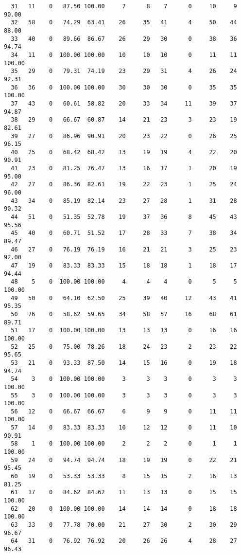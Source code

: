 \begin{verbatim}
  31   11    0   87.50 100.00     7      8    7      0     10     9    90.00
  32   58    0   74.29  63.41    26     35   41      4     50    44    88.00
  33   40    0   89.66  86.67    26     29   30      0     38    36    94.74
  34   11    0  100.00 100.00    10     10   10      0     11    11   100.00
  35   29    0   79.31  74.19    23     29   31      4     26    24    92.31
  36   36    0  100.00 100.00    30     30   30      0     35    35   100.00
  37   43    0   60.61  58.82    20     33   34     11     39    37    94.87
  38   29    0   66.67  60.87    14     21   23      3     23    19    82.61
  39   27    0   86.96  90.91    20     23   22      0     26    25    96.15
  40   25    0   68.42  68.42    13     19   19      4     22    20    90.91
  41   23    0   81.25  76.47    13     16   17      1     20    19    95.00
  42   27    0   86.36  82.61    19     22   23      1     25    24    96.00
  43   34    0   85.19  82.14    23     27   28      1     31    28    90.32
  44   51    0   51.35  52.78    19     37   36      8     45    43    95.56
  45   40    0   60.71  51.52    17     28   33      7     38    34    89.47
  46   27    0   76.19  76.19    16     21   21      3     25    23    92.00
  47   19    0   83.33  83.33    15     18   18      1     18    17    94.44
  48    5    0  100.00 100.00     4      4    4      0      5     5   100.00
  49   50    0   64.10  62.50    25     39   40     12     43    41    95.35
  50   76    0   58.62  59.65    34     58   57     16     68    61    89.71
  51   17    0  100.00 100.00    13     13   13      0     16    16   100.00
  52   25    0   75.00  78.26    18     24   23      2     23    22    95.65
  53   21    0   93.33  87.50    14     15   16      0     19    18    94.74
  54    3    0  100.00 100.00     3      3    3      0      3     3   100.00
  55    3    0  100.00 100.00     3      3    3      0      3     3   100.00
  56   12    0   66.67  66.67     6      9    9      0     11    11   100.00
  57   14    0   83.33  83.33    10     12   12      0     11    10    90.91
  58    1    0  100.00 100.00     2      2    2      0      1     1   100.00
  59   24    0   94.74  94.74    18     19   19      0     22    21    95.45
  60   19    0   53.33  53.33     8     15   15      2     16    13    81.25
  61   17    0   84.62  84.62    11     13   13      0     15    15   100.00
  62   20    0  100.00 100.00    14     14   14      0     18    18   100.00
  63   33    0   77.78  70.00    21     27   30      2     30    29    96.67
  64   31    0   76.92  76.92    20     26   26      4     28    27    96.43

\end{verbatim}
